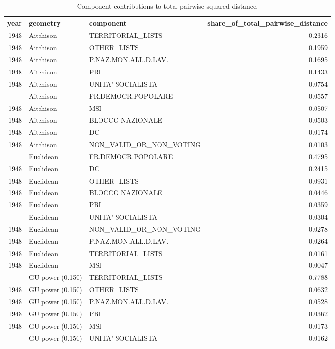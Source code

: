 
\begin{longtable}[t]{rllr}
\caption{\label{tab:app_distance_contributions}Component contributions to total pairwise squared distance.}\\
\toprule
year & geometry & component & share\_of\_total\_pairwise\_distance\\
\midrule
1948 & Aitchison & TERRITORIAL\_LISTS & 0.2316\\
1948 & Aitchison & OTHER\_LISTS & 0.1959\\
1948 & Aitchison & P.NAZ.MON.ALL.D.LAV. & 0.1695\\
1948 & Aitchison & PRI & 0.1433\\
1948 & Aitchison & UNITA' SOCIALISTA & 0.0754\\
\addlinespace
1948 & Aitchison & FR.DEMOCR.POPOLARE & 0.0557\\
1948 & Aitchison & MSI & 0.0507\\
1948 & Aitchison & BLOCCO NAZIONALE & 0.0503\\
1948 & Aitchison & DC & 0.0174\\
1948 & Aitchison & NON\_VALID\_OR\_NON\_VOTING & 0.0103\\
\addlinespace
1948 & Euclidean & FR.DEMOCR.POPOLARE & 0.4795\\
1948 & Euclidean & DC & 0.2415\\
1948 & Euclidean & OTHER\_LISTS & 0.0931\\
1948 & Euclidean & BLOCCO NAZIONALE & 0.0446\\
1948 & Euclidean & PRI & 0.0359\\
\addlinespace
1948 & Euclidean & UNITA' SOCIALISTA & 0.0304\\
1948 & Euclidean & NON\_VALID\_OR\_NON\_VOTING & 0.0278\\
1948 & Euclidean & P.NAZ.MON.ALL.D.LAV. & 0.0264\\
1948 & Euclidean & TERRITORIAL\_LISTS & 0.0161\\
1948 & Euclidean & MSI & 0.0047\\
\addlinespace
1948 & GU power (0.150) & TERRITORIAL\_LISTS & 0.7788\\
1948 & GU power (0.150) & OTHER\_LISTS & 0.0632\\
1948 & GU power (0.150) & P.NAZ.MON.ALL.D.LAV. & 0.0528\\
1948 & GU power (0.150) & PRI & 0.0362\\
1948 & GU power (0.150) & MSI & 0.0173\\
\addlinespace
1948 & GU power (0.150) & UNITA' SOCIALISTA & 0.0162\\

\end{longtable}
